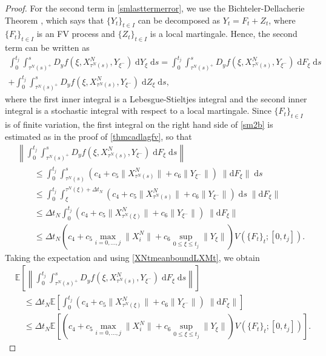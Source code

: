 \documentclass[reqno,12pt]{amsart}
\theoremstyle{plain} %
\theoremstyle{definition} %
\begin{document}
\begin{proof}
    For the second term in \eqref{smlasttermerror}, we use the Bichteler-Dellacherie Theorem \cite[Theorem III.47]{Protter2005}, which says that $\{Y_t\}_{t\in I}$ can be decomposed as $Y_t = F_t + Z_t$, where $\{F_t\}_{t\in I}$ is an FV process and $\{Z_t\}_{t\in I}$ is a local martingale. Hence, the second term can be written as
    \begin{multline}
        \label{sm2b}
        \int_0^{t_j} \int_{\tau^N(s)^+}^s D_y f(\xi, X_{\tau^N(s)}^N, Y_{\xi^-}) \;\mathrm{d}Y_\xi \;\mathrm{d}s = \int_0^{t_j} \int_{\tau^N(s)^+}^s D_y f(\xi, X_{\tau^N(s)}^N, Y_{\xi^-}) \;\mathrm{d}F_\xi \;\mathrm{d}s \\  
        + \int_0^{t_j} \int_{\tau^N(s)^+}^s D_y f(\xi, X_{\tau^N(s)}^N, Y_{\xi^-}) \;\mathrm{d}Z_\xi \;\mathrm{d}s,
    \end{multline}
    where the first inner integral is a Lebesgue-Stieltjes integral and the second inner integral is a stochastic integral with respect to a local martingale. Since $\{F_t\}_{t\in I}$ is of finite variation, the first integral on the right hand side of \eqref{sm2b} is estimated as in the proof of \cref{thmcadlagfv}, so that
    \begin{align*}
        & \left\|\int_0^{t_j} \int_{\tau^N(s)^+}^s D_y f(\xi, X_{\tau^N(s)}^N, Y_{\xi^-}) \;\mathrm{d}F_\xi\;\mathrm{d}s\right\| \\
        & \qquad \leq \int_0^{t_j} \int_{\tau^N(s)}^s \left(c_4 + c_5 \|X_{\tau^N(s)}^N\| + c_6\|Y_{\xi^-}\|\right)\;\|\mathrm{d}F_\xi\|\;\mathrm{d}s \\
        & \qquad \leq \int_0^{t_j} \int_{\xi}^{\tau^N(\xi) + \Delta t_N} \left(c_4 + c_5 \|X_{\tau^N(s)}^N\| + c_6\|Y_{\xi^-}\|\right)\;\mathrm{d}s\;\|\mathrm{d}F_\xi\| \\
        & \qquad \leq \Delta t_N\int_0^{t_j} \left(c_4 + c_5 \|X_{\tau^N(\xi)}^N\| + c_6\|Y_{\xi^-}\|\right)\;\|\mathrm{d}F_\xi\| \\
        & \qquad \leq \Delta t_N\left(c_4 + c_5 \max_{i=0, \ldots, j}\|X_{i}^N\| + c_6\sup_{0\leq \xi \leq t_j}\|Y_{\xi}\|\right)V(\{F_t\}_t; [0, t_j]).
    \end{align*}
    Taking the expectation and using \eqref{XNtmeanboundLXMt}, we obtain
    \begin{align*}
        & \mathbb{E}\left[\left\|\int_0^{t_j} \int_{\tau^N(s)^+}^s D_y f(\xi, X_{\tau^N(s)}^N, Y_{\xi^-}) \;\mathrm{d}F_\xi\;\mathrm{d}s\right\|\right] \\
        & \quad \leq \Delta t_N\mathbb{E}\left[\int_0^{t_j} \left(c_4 + c_5 \|X_{\tau^N(\xi)}^N\| + c_6\|Y_{\xi^-}\|\right)\;\|\mathrm{d}F_\xi\|\right] \\
        & \quad \leq \Delta t_N\mathbb{E}\left[\left(c_4 + c_5 \max_{i=0, \ldots, j}\|X_{i}^N\| + c_6\sup_{0\leq \xi \leq t_j}\|Y_{\xi}\|\right)V(\{F_t\}_t; [0, t_j])\right].
    \end{align*}
    

\end{proof}
\end{document}
